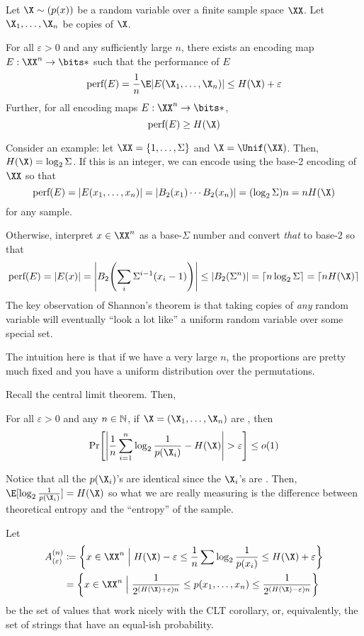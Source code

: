 \documentclass[class=co432,notes,tikz]{agony}
\begin{document}
\begin{theorem}
  Let $\X \sim (p(x))$ be a random variable over a finite sample space $\XX$.
  Let $\X_1,\dotsc,\X_n$ be \iid copies of $\X$.

  For all $\varepsilon > 0$ and any sufficiently large $n$,
  there exists an encoding map $E : \XX^n \to \bits*$
  such that the performance of $E$
  \[ \text{perf}(E) = \frac1n\E\abs{E(\X_1,\dotsc,\X_n)} \leq H(\X) + \varepsilon \]
  Further, for all encoding maps $E : \XX^n \to \bits*$,
  \[ \text{perf}(E) \geq H(\X) \]
\end{theorem}

Consider an example: let $\XX = \{1,\dotsc,\Sigma\}$ and $\X = \Unif(\XX)$.
Then, $H(\X) = \log_2\Sigma$.
If this is an integer, we can encode using the base-2 encoding of $\XX$
so that
\[
  \text{perf}(E)
  = \abs{E(x_1,\dotsc,x_n)} = \abs{B_2(x_1)\cdots B_2(x_n)}
  = (\log_2\Sigma)n = nH(\X)
\]
for any sample.

Otherwise, interpret $x \in \XX^n$ as a base-$\Sigma$ number
and convert \emph{that} to base-2 so that
\[
  \text{perf}(E)
  =\abs{E(x)}
  = \abs{B_2\qty(\sum_i \Sigma^{i-1} (x_i-1))}
  \leq \abs{B_2(\Sigma^n)}
  = \ceil{n\log_2\Sigma}
  = \ceil{nH(\X)}
\]
The key observation of Shannon's theorem
is that taking copies of \emph{any} random variable will eventually
``look a lot like'' a uniform random variable over some special set.

The intuition here is that if we have a very large $n$,
the proportions are pretty much fixed and you have a uniform distribution
over the permutations.

Recall the central limit theorem. Then,

\begin{corollary}
  For all $\varepsilon > 0$ and any $n \in \mathbb{N}$,
  if $\X = (\X_1,\dotsc,\X_n)$ are \iid, then
  \[ \Pr[\abs{\frac1n\sum_{i=1}^n\log_2\frac{1}{p(\X_i)} - H(\X)} > \varepsilon] \leq o(1) \]
\end{corollary}
Notice that all the $p(\X_i)$'s are identical since the $\X_i$'s are \iid.
Then, $\E[\log_2\frac{1}{p(\X_i)}] = H(\X)$ so what we are really measuring
is the difference between theoretical entropy and the ``entropy'' of the sample.

\newcommand{\aeps}{A_{(\varepsilon)}^{(n)}}
\begin{defn}
  Let
  \begin{align*}
    \aeps
     & \coloneqq \qty{x\in\XX^n \Bigm| H(\X) - \varepsilon \leq \frac1n\sum\log_2\frac{1}{p(x_i)} \leq H(\X) + \varepsilon}       \\
     & = \qty{x\in\XX^n \Bigm| \frac{1}{2^{(H(\X)+\varepsilon)n}} \leq p(x_1,\dotsc,x_n) \leq \frac{1}{2^{(H(\X)-\varepsilon)n}}}
  \end{align*}
  be the set of values that work nicely with the CLT corollary,
  or, equivalently, the set of strings that have an equal-ish probability.
\end{defn}
\end{document}
